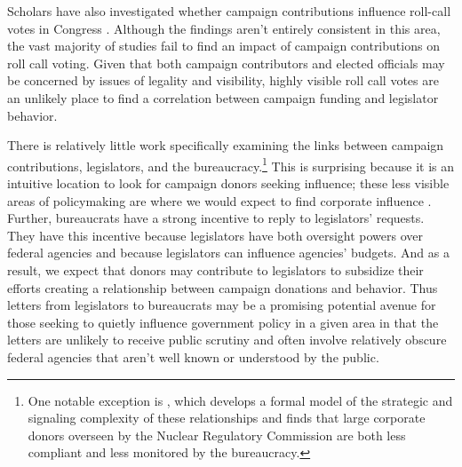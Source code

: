 \documentclass{article}
\begin{document}
Scholars have also investigated whether campaign contributions influence roll-call votes in Congress \citep{AnsolabehereFigueiredoSnyder2003, RoscoeJenkins2005, CalcagnoJackson1998, Chappell1982, ConleyMcCabe2012, EngelJackson1998, Fleisher1993, Grenzke1989, MilyoPrimoGroseclose2000, JonesKeiser1987, KauRubin1982, LanLot1990,Lessig2011, MoorePowellReeves2013, Neustadtl1990, Saltzman1987, Stratmann1991, Stratmann1992, Stratmann1995, Stratmann2002, Wawro2001, Wright1985, Wright1989, Wright1990, Wright2004}.  Although the findings aren't entirely consistent in this area, the vast majority of studies fail to find an impact of campaign contributions on roll call voting. Given that both campaign contributors and elected officials may be concerned by issues of legality and visibility, highly visible roll call votes are an unlikely place to find a correlation between campaign funding and legislator behavior. 

There is relatively little work specifically examining the links between campaign contributions, legislators, and the bureaucracy.\footnote{One notable exception is \citet{GordonHafer2005}, which develops a formal model of the strategic and signaling complexity of these relationships and finds that large corporate donors overseen by the Nuclear Regulatory Commission are both less compliant and less monitored by the bureaucracy.} 
This is surprising because it is an intuitive location to look for campaign donors seeking influence; these less visible areas of policymaking are where we would expect to find corporate influence \citep{Hall1996}. Further, bureaucrats have a strong incentive to reply to legislators' requests.  They have this incentive because legislators have both oversight powers over federal agencies and because legislators can influence agencies' budgets.  And as a result, we expect that donors may contribute to legislators to subsidize their efforts creating a relationship between campaign donations and behavior. 
Thus letters from legislators to bureaucrats may be a promising potential avenue for those seeking to quietly influence government policy in a given area in that the letters are unlikely to receive public scrutiny and often involve relatively obscure federal agencies that aren't well known or understood by the public. 

\end{document}
